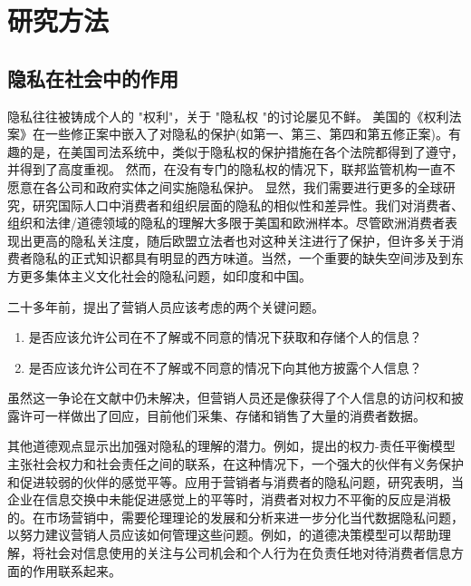 \documentclass[degree=project,degree-type=project,cjk-font=windows]{thuthesis}
\begin{document}
\chapter{研究方法}
\label{chap2}

\section{隐私在社会中的作用}
隐私往往被铸成个人的 "权利"，关于 "隐私权 "的讨论屡见不鲜。
美国的《权利法案》在一些修正案中嵌入了对隐私的保护(如第一、第三、第四和第五修正案)。有趣的是，在美国司法系统中，类似于隐私权的保护措施在各个法院都得到了遵守，并得到了高度重视。
然而，在没有专门的隐私权的情况下，联邦监管机构一直不愿意在各公司和政府实体之间实施隐私保护。
显然，我们需要进行更多的全球研究，研究国际人口中消费者和组织层面的隐私的相似性和差异性。我们对消费者、组织和法律/道德领域的隐私的理解大多限于美国和欧洲样本。尽管欧洲消费者表现出更高的隐私关注度，随后欧盟立法者也对这种关注进行了保护，但许多关于消费者隐私的正式知识都具有明显的西方味道。当然，一个重要的缺失空间涉及到东方更多集体主义文化社会的隐私问题，如印度和中国。

二十多年前，\cite{Bloom}提出了营销人员应该考虑的两个关键问题。

\begin{enumerate}
\item 是否应该允许公司在不了解或不同意的情况下获取和存储个人的信息？
\item 是否应该允许公司在不了解或不同意的情况下向其他方披露个人信息？
\end{enumerate}

虽然这一争论在文献中仍未解决，但营销人员还是像获得了个人信息的访问权和披露许可一样做出了回应，目前他们采集、存储和销售了大量的消费者数据。

其他道德观点显示出加强对隐私的理解的潜力。例如，\cite{Murphy}提出的权力-责任平衡模型主张社会权力和社会责任之间的联系，在这种情况下，一个强大的伙伴有义务保护和促进较弱的伙伴的感觉平等。应用于营销者与消费者的隐私问题，研究表明，当企业在信息交换中未能促进感觉上的平等时，消费者对权力不平衡的反应是消极的。在市场营销中，需要伦理理论的发展和分析来进一步分化当代数据隐私问题，以努力建议营销人员应该如何管理这些问题。例如，\cite{Ferrell}的道德决策模型可以帮助理解，将社会对信息使用的关注与公司机会和个人行为在负责任地对待消费者信息方面的作用联系起来。
\end{document}
